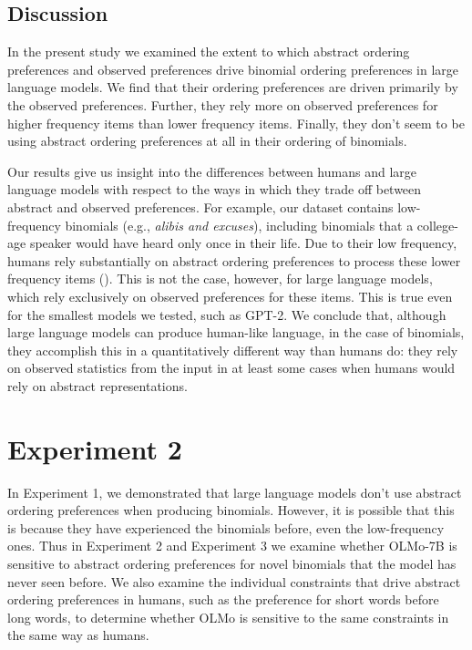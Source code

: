 \documentclass[
  12pt,
  letterpaper,
]{scrreport}
\begin{document}
\subsection{Discussion}\label{discussion-5}

In the present study we examined the extent to which abstract ordering
preferences and observed preferences drive binomial ordering preferences
in large language models. We find that their ordering preferences are
driven primarily by the observed preferences. Further, they rely more on
observed preferences for higher frequency items than lower frequency
items. Finally, they don't seem to be using abstract ordering
preferences at all in their ordering of binomials.

Our results give us insight into the differences between humans and
large language models with respect to the ways in which they trade off
between abstract and observed preferences. For example, our dataset
contains low-frequency binomials (e.g., \emph{alibis and excuses}),
including binomials that a college-age speaker would have heard only
once in their life. Due to their low frequency, humans rely
substantially on abstract ordering preferences to process these lower
frequency items (). This
is not the case, however, for large language models, which rely
exclusively on observed preferences for these items. This is true even
for the smallest models we tested, such as GPT-2. We conclude that,
although large language models can produce human-like language, in the
case of binomials, they accomplish this in a quantitatively different
way than humans do: they rely on observed statistics from the input in
at least some cases when humans would rely on abstract representations.

\section{Experiment 2}\label{experiment-2-1}

In Experiment 1, we demonstrated that large language models don't use
abstract ordering preferences when producing binomials. However, it is
possible that this is because they have experienced the binomials
before, even the low-frequency ones. Thus in Experiment 2 and Experiment
3 we examine whether OLMo-7B is sensitive to abstract ordering
preferences for novel binomials that the model has never seen before. We
also examine the individual constraints that drive abstract ordering
preferences in humans, such as the preference for short words before
long words, to determine whether OLMo is sensitive to the same
constraints in the same way as humans.
\end{document}
